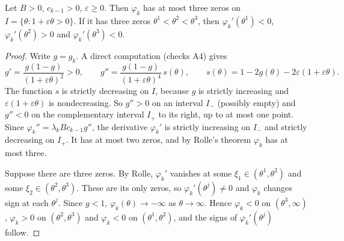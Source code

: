 \documentclass[11pt,a4paper]{report}
\newcommand*{\eps}{\varepsilon}
\begin{document}
\begin{lemma}[note={at most three states}]\label{lem:three}
Let \(B>0\), \(c_{k-1}>0\), \(\eps\ge0\). Then \(\varphi_k\) has at most three zeros on \(I=\{\theta:1+\eps\theta>0\}\).
If it has three zeros \(\theta^1<\theta^2<\theta^3\), then \(\varphi_k'(\theta^1)<0\), \(\varphi_k'(\theta^2)>0\) and
\(\varphi_k'(\theta^3)<0\).
\end{lemma}
\begin{proof}
Write \(g=g_k\). A direct computation (checks A4) gives
\[
g'=\frac{g(1-g)}{(1+\eps\theta)^2}>0,\qquad
g''=\frac{g(1-g)}{(1+\eps\theta)^4}\,s(\theta),\qquad s(\theta)=1-2g(\theta)-2\eps(1+\eps\theta).
\]
The function \(s\) is strictly decreasing on \(I\), because \(g\) is strictly increasing and \(\eps(1+\eps\theta)\) is
nondecreasing. So \(g''>0\) on an interval \(I_-\) (possibly empty) and \(g''<0\) on the complementary interval \(I_+\)
to its right, up to at most one point. Since \(\varphi_k''=\lambda_kBc_{k-1}g''\), the derivative \(\varphi_k'\) is
strictly increasing on \(I_-\) and strictly decreasing on \(I_+\). It has at most two zeros, and by Rolle's theorem
\(\varphi_k\) has at most three.

Suppose there are three zeros. By Rolle, \(\varphi_k'\) vanishes at some \(\xi_1\in(\theta^1,\theta^2)\) and some
\(\xi_2\in(\theta^2,\theta^3)\). These are its only zeros, so \(\varphi_k'(\theta^j)\ne0\) and \(\varphi_k\) changes
sign at each \(\theta^j\). Since \(g<1\), \(\varphi_k(\theta)\to-\infty\) as \(\theta\to\infty\). Hence
\(\varphi_k<0\) on \((\theta^3,\infty)\), \(\varphi_k>0\) on \((\theta^2,\theta^3)\) and \(\varphi_k<0\) on
\((\theta^1,\theta^2)\), and the signs of \(\varphi_k'(\theta^j)\) follow.
\end{proof}
\end{document}
